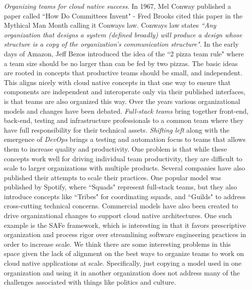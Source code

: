 \documentclass[conference]{IEEEtran}
\begin{document}
\textit{Organizing teams for cloud native success}.  In 1967, Mel Conway published a paper called ``How Do Committees Invent" - Fred Brooks cited this paper in the Mythical Man Month\cite{Brooks1975} calling it Conways law\cite{ConwaysLaw}. Conways law states \textit{``Any organization that designs a system (defined broadly) will produce a design whose structure is a copy of the organization's communication structure"}.  In the early days of Amazon, Jeff Bezos introduced the idea of the ``2 pizza team rule"\cite{TwoPizza} where a team size should be no larger than can be fed by two pizzas.  The basic ideas are rooted in concepts that productive teams should be small, and independent.  This aligns nicely with cloud native concepts in that one way to ensure that components are independent and interoperate only via their published interfaces, is that teams are also organized this way.  Over the years various organizational models and changes have been debated. \textit{Full-stack teams} bring together front-end, back-end, testing and infrastructure professionals to a common team where they have full responsibility for their technical assets. \textit{Shifting left} along with the emergence of \textit{DevOps} brings a testing and automation focus to teams that allows them to increase quality and productivity.  One problem is that while these concepts work well for driving individual team productivity, they are difficult to scale to larger organizations with multiple products.  Several companies have also published their attempts to scale their practices.  One popular model was published by Spotify\cite{SpotifyModel}, where ``Squads" represent full-stack teams, but they also introduce concepts like ``Tribes" for coordinating squads, and ``Guilds" to address cross-cutting technical concerns. Commercial models have also been created to drive organizational changes to support cloud native architectures.  One such example is the SAFe\cite{SAFeAgile} framework, which is interesting in that it favors prescriptive organization and process rigor over streamlining software engineering practices in order to increase scale. We think there are some interesting problems in this space given the lack of alignment on the best ways to organize teams to work on cloud native applications at scale. Specifically, just copying a model used in one organization and using it in another organization does not address many of the challenges associated with things like politics and culture. 
\end{document}
